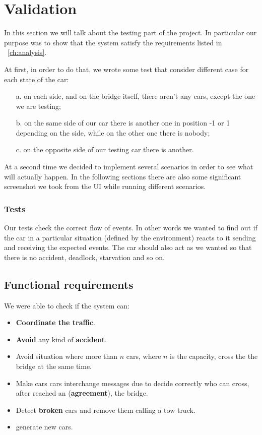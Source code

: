 \chapter{Validation}\label{ch:validation}
In this section we will talk about the testing part of the project. In particular our purpose was to 
show that the system satisfy the requirements listed in ~\ref{ch:analysis}. \\
\noindent

At first, in order to do that, we wrote some test that consider different case for each state of the car:
\begin{itemize}
    \item [a.] on each side, and on the bridge itself, there aren't any cars, except the one we are testing;
    \item [b.] on the same side of our car there is another one in position -1 or 1 depending on the side, 
    while on the other one there is nobody;
    \item [c.] on the opposite side of our testing car there is another.
\end{itemize}

At a second time we decided to implement several scenarios in order to see what will actually happen. 
In the following sections there are also some significant screenshot we took from the UI while running 
different scenarios.

\subsection{Tests}
\noindent

Our tests check the correct flow of events. In other words we wanted to find out if the car in a 
particular situation (defined by the environment) reacts to it sending and receiving the expected
events. The car should also act as we wanted so that there is no accident, deadlock, starvation and so on.

\section{Functional requirements}

We were able to check if the system can:
\begin{itemize}
    \item \textbf{Coordinate the traffic}.
    \item \textbf{Avoid} any kind of \textbf{accident}.
    \item Avoid situation where more than $n$ cars, where $n$ is the capacity, cross the the bridge at 
    the same time.
    \item Make cars cars interchange messages due to decide correctly who can cross, after reached an
    (\textbf{agreement}), the bridge.
    \item Detect \textbf{broken} cars and remove them calling a tow truck.
    \item generate new cars.
\end{itemize}


